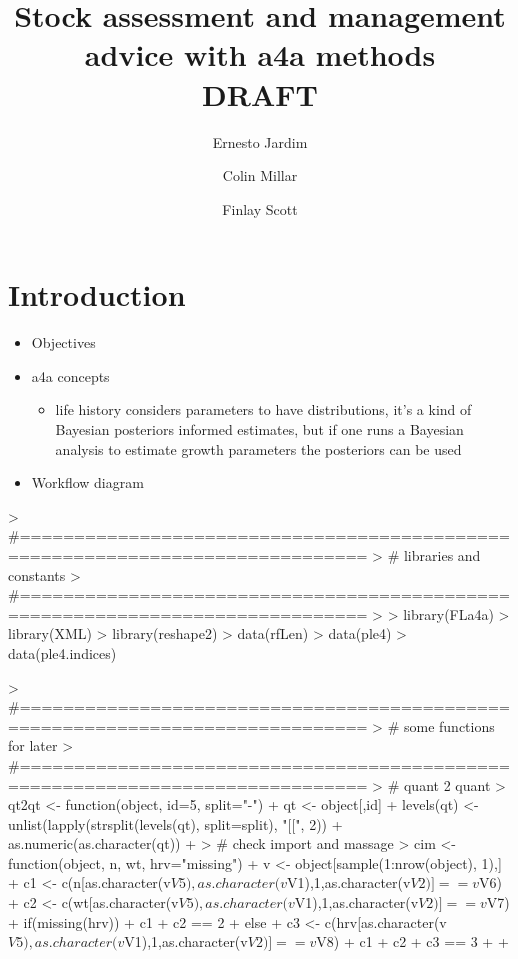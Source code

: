 \documentclass[a4paper,english,10pt]{article}
\begin{document}


\title{Stock assessment and management advice with a4a methods \\ DRAFT}

\author[1]{Ernesto Jardim}
\author[1]{Colin Millar}
\author[1]{Finlay Scott}

\maketitle
\tableofcontents
\newpage

\section{Introduction}

\begin{itemize}
	\item Objectives
	\item a4a concepts
	\begin{itemize}
		\item life history considers parameters to have distributions, it's a kind of Bayesian posteriors informed estimates, but if one runs a Bayesian analysis to estimate growth parameters the posteriors can be used  
	\end{itemize}
	\item Workflow diagram
\end{itemize}


\begin{Schunk}
\begin{Sinput}
> #==============================================================================
> # libraries and constants 
> #==============================================================================
> 
> library(FLa4a)
> library(XML)
> library(reshape2)
> data(rfLen)
> data(ple4)
> data(ple4.indices)
\end{Sinput}
\end{Schunk}

\begin{Schunk}
\begin{Sinput}
> #==============================================================================
> # some functions for later 
> #==============================================================================
> # quant 2 quant
> qt2qt <- function(object, id=5, split="-"){
+ 	qt <- object[,id]
+ 	levels(qt) <- unlist(lapply(strsplit(levels(qt), split=split), "[[", 2))
+ 	as.numeric(as.character(qt))
+ }
> # check import and massage
> cim <- function(object, n, wt, hrv="missing"){
+ 	v <- object[sample(1:nrow(object), 1),]
+ 	c1 <- c(n[as.character(v$V5),as.character(v$V1),1,as.character(v$V2)]==v$V6)
+ 	c2 <- c(wt[as.character(v$V5),as.character(v$V1),1,as.character(v$V2)]==v$V7)
+ 	if(missing(hrv)){
+ 		c1 + c2 == 2	
+ 	} else {
+ 		c3 <- c(hrv[as.character(v$V5),as.character(v$V1),1,as.character(v$V2)]==v$V8)
+ 		c1 + c2 + c3 == 3	
+ 	}
+ }
\end{Sinput}
\end{Schunk}
\end{document}
